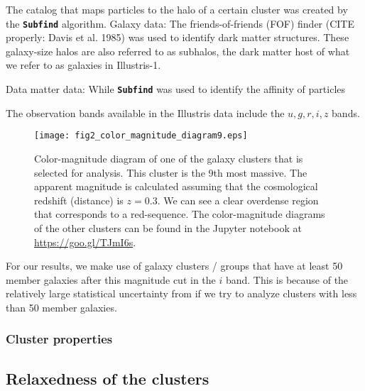 The catalog that maps particles to the halo of a certain cluster was created by
the {\bf \texttt{Subfind}} algorithm.
Galaxy data: 
The friends-of-friends (FOF) finder (CITE properly: Davis et al. 1985) was used to identify
dark matter structures. These galaxy-size halos are also referred to as
subhalos, the dark matter host of what we refer to as galaxies in Illustris-1. 

Data matter data:
While {\bf \texttt{Subfind}} was used to identify the affinity of particles 

The observation bands available in the Illustris data include the $u, g, r, i,
z$ bands. 

\begin{figure}
	\centering
	\texttt{[image: fig2\_color\_magnitude\_diagram9.eps]}
	\caption{Color-magnitude diagram of one of the galaxy clusters that is selected for 
		analysis. This cluster is the 9th most massive. 
		The apparent magnitude is calculated assuming that 
		the cosmological redshift (distance) is $z = 0.3$. 
		We can see a clear overdense region that corresponds to a red-sequence.
		The color-magnitude diagrams of the other clusters can be found in the
		Jupyter notebook at \href{https://github.com/karenyyng/galaxy_DM_offset/blob/master/code/analyses/fig2_color_magnitude_diagram.ipynb}{https://goo.gl/TJmI6s}.
		\label{fig:color_magnitude_diagram}
	} 
\end{figure}
For our results, we make use of galaxy clusters / groups 
that have at least 50 member galaxies after this magnitude cut in the $i$ band. 
This is because of the relatively large statistical uncertainty from if we try
to analyze clusters with less than 50 member galaxies. 




\subsubsection{Cluster properties}
\label{subsubsec:cluster_properties}

\subsection{Relaxedness of the clusters}

